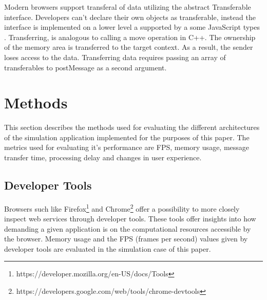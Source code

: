 \documentclass[conference, 9pt]{IEEEtran}
\begin{document}
Modern browsers support transferal of data utilizing the abstract Transferable interface. Developers can't declare their own objects as transferable, instead the interface is implemented on a lower level a supported by a some JavaScript types \cite{mdnTransferable}. Transferring, is analogous to calling a move operation in C++. The ownership of the memory area is transferred to the target context. As a result, the sender loses access to the data. Transferring data requires passing an array of transferables to postMessage as a second argument. 



\section{Methods}
\label{sec:methods}

This section describes the methods used for evaluating the different architectures of the simulation application implemented for the purposes of this paper. The metrics used for evaluating it's performance are FPS, memory usage, message transfer time, processing delay and changes in user experience.

\subsection{Developer Tools}

Browsers such like Firefox\footnote{https://developer.mozilla.org/en-US/docs/Tools} and Chrome\footnote{https://developers.google.com/web/tools/chrome-devtools} offer a 
possibility to more closely inspect web services through developer tools. These tools offer insights into how demanding a given application
is on the computational resources accessible by the browser. Memory usage and the FPS (frames per second) values given by developer tools are evaluated in the simulation
case of this paper.
\end{document}
